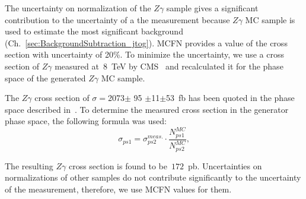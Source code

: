 The uncertainty on normalization of the $Z\gamma$ sample gives a significant contribution to the uncertainty of a the measurement because $Z\gamma$ MC sample is used to estimate the most significant background (Ch.~\ref{sec:BackgroundSubtraction_jtog}). MCFN provides a value of the cross section with uncertainty of 20\%. To minimize the uncertainty, we use a cross section of $Z\gamma$ measured at~8~TeV by CMS~\cite{ref_Zg8TeV} and recalculated it for the phase space of the generated $Z\gamma$ MC sample. 

The $Z\gamma$ cross section of $\sigma = $2073$ \pm$ 95 $\pm$11$ \pm $53~fb has been quoted in the phase space described in~\cite{ref_Zg8TeV}. To determine the measured cross section in the generator phase space, the following formula was used:
\begin{equation}
\sigma_{ps1} = \sigma_{ps2}^{meas.} \cdot \frac{N_{ps1}^{MC}}{N_{ps2}^{MC}},
\end{equation}

The resulting $Z\gamma$ cross section is found to be~$172$~pb. Uncertainties on normalizations of other samples do not contribute significantly to the uncertainty of the measurement, therefore, we use MCFN values for them.


